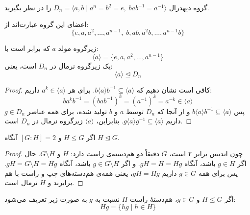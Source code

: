 \begin{frame}
    \begin{example}
        گروه دیهدرال \( D_n = \langle a, b \mid a^n = b^2 = e,\; bab^{-1} = a^{-1} \rangle \) را در نظر بگیرید.

        اعضای این گروه عبارت‌اند از:
        \[
            \{ e, a, a^2, \ldots, a^{n-1},\; b, ab, a^2b, \ldots, a^{n-1}b \}
        \]

        زیرگروه مولد \( a \) که برابر است با:
        \[
            \langle a \rangle = \{ e, a, a^2, \ldots, a^{n-1} \}
        \]
        یک زیرگروه نرمال در \( D_n \) است، یعنی:
        \[
            \langle a \rangle \trianglelefteq D_n
        \]
    \end{example}

    \begin{proof}
        کافی است نشان دهیم که \( b \langle a \rangle b^{-1} \subseteq \langle a \rangle \).
        برای هر \( a^k \in \langle a \rangle \) داریم:
        \[
            b a^k b^{-1} = (bab^{-1})^k = (a^{-1})^k = a^{-k} \in \langle a \rangle
        \]
        پس \( b \langle a \rangle b^{-1} \subseteq \langle a \rangle \) و از آنجا که \( D_n \) توسط \( a \) و \( b \) تولید شده، برای همه عناصر \( g \in D_n \) داریم \( g \langle a \rangle g^{-1} \subseteq \langle a \rangle \).
        بنابراین، \( \langle a \rangle \) زیرگروه نرمال در \( D_n \) است.
    \end{proof}
\end{frame}

\begin{frame}
    \begin{theorem}
        اگر \( H \leq G \) و \( [G : H] = 2 \) آنگاه \( H \trianglelefteq G \).
    \end{theorem}

    \begin{proof}
        چون اندیس برابر ۲ است، \( G \) دقیقاً دو هم‌دسته‌ی راست دارد: \( H \) و \( G \setminus H \).
        حال اگر \( g \in H \) باشد، آنگاه \( gH = H = Hg \).
        و اگر \( g \in G \setminus H \) باشد، آنگاه \( gH = G \setminus H = Hg \).
        پس برای همه \( g \in G \) داریم \( gH = Hg \)، یعنی همه‌ی هم‌دسته‌های چپ و راست با هم برابرند و \( H \) نرمال است.
    \end{proof}
\end{frame}

\begin{frame}
    \begin{definition}
        اگر \( H \leq G \) و \( g \in G \)، هم‌دستهٔ راست \( H \) نسبت به \( g \) به صورت زیر تعریف می‌شود:
        \[
            Hg = \{ hg \mid h \in H \}
        \]
    \end{definition}
\end{frame}


